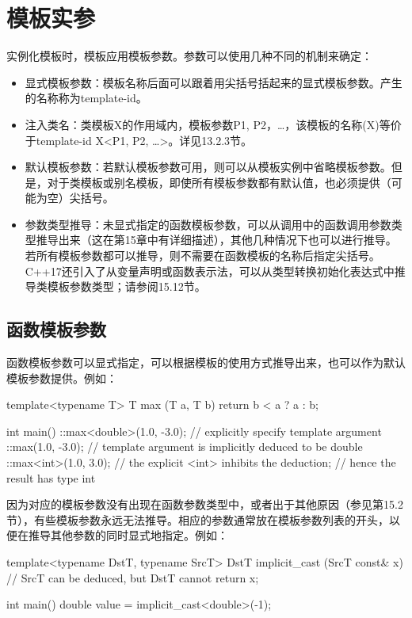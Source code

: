 \section{模板实参}

实例化模板时，模板应用模板参数。参数可以使用几种不同的机制来确定：

\begin{itemize}
\item 
显式模板参数：模板名称后面可以跟着用尖括号括起来的显式模板参数。产生的名称称为template-id。

\item 
注入类名：类模板X的作用域内，模板参数P1, P2，…，该模板的名称(X)等价于template-id X<P1, P2, …>。详见13.2.3节。

\item 
默认模板参数：若默认模板参数可用，则可以从模板实例中省略模板参数。但是，对于类模板或别名模板，即使所有模板参数都有默认值，也必须提供（可能为空）尖括号。

\item 
参数类型推导：未显式指定的函数模板参数，可以从调用中的函数调用参数类型推导出来（这在第15章中有详细描述），其他几种情况下也可以进行推导。若所有模板参数都可以推导，则不需要在函数模板的名称后指定尖括号。C++17还引入了从变量声明或函数表示法，可以从类型转换初始化表达式中推导类模板参数类型；请参阅15.12节。
\end{itemize}

\subsection{函数模板参数}

函数模板参数可以显式指定，可以根据模板的使用方式推导出来，也可以作为默认模板参数提供。例如：

\begin{cpp}
template<typename T>
T max (T a, T b)
{
	return b < a ? a : b;
}

int main()
{
	::max<double>(1.0, -3.0); // explicitly specify template argument
	::max(1.0, -3.0); // template argument is implicitly deduced to be double
	::max<int>(1.0, 3.0); // the explicit <int> inhibits the deduction;
	// hence the result has type int
}
\end{cpp}

因为对应的模板参数没有出现在函数参数类型中，或者出于其他原因（参见第15.2节），有些模板参数永远无法推导。相应的参数通常放在模板参数列表的开头，以便在推导其他参数的同时显式地指定。例如：

\begin{cpp}
template<typename DstT, typename SrcT>
DstT implicit_cast (SrcT const& x) // SrcT can be deduced, but DstT cannot
{
	return x;
}

int main()
{
	double value = implicit_cast<double>(-1);
}
\end{cpp}

